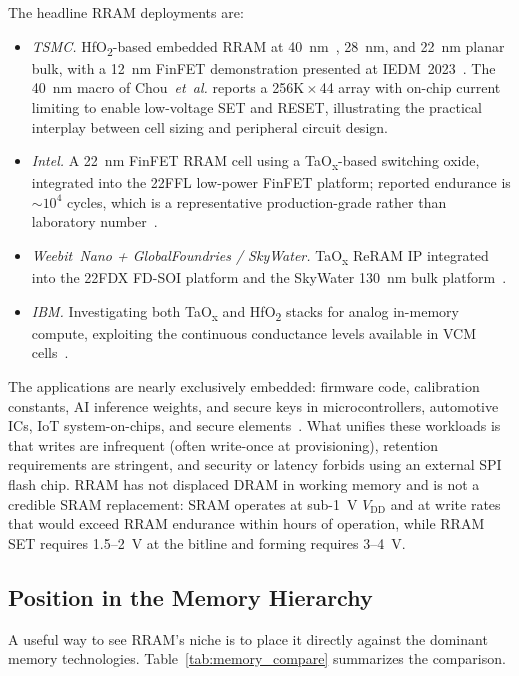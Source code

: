 \documentclass[lettersize,journal]{IEEEtran}
\begin{document}
The headline RRAM deployments are:
\begin{itemize}
\item \textit{TSMC.} HfO\textsubscript{2}-based embedded RRAM at 40~nm~\cite{ref_chou2018}, 28~nm, and 22~nm planar bulk, with a 12~nm FinFET demonstration presented at IEDM~2023~\cite{ref_hellenbrand2024}. The 40~nm macro of Chou~\textit{et~al.} reports a 256K\,$\times$\,44 array with on-chip current limiting to enable low-voltage SET and RESET, illustrating the practical interplay between cell sizing and peripheral circuit design.
\item \textit{Intel.} A 22~nm FinFET RRAM cell using a TaO\textsubscript{x}-based switching oxide, integrated into the 22FFL low-power FinFET platform; reported endurance is ${\sim}10^4$ cycles, which is a representative production-grade rather than laboratory number~\cite{ref_golonzka2019}.
\item \textit{Weebit~Nano + GlobalFoundries / SkyWater.} TaO\textsubscript{x} ReRAM IP integrated into the 22FDX FD-SOI platform and the SkyWater 130~nm bulk platform~\cite{ref_hellenbrand2024}.
\item \textit{IBM.} Investigating both TaO\textsubscript{x} and HfO\textsubscript{2} stacks for analog in-memory compute, exploiting the continuous conductance levels available in VCM cells~\cite{ref_hellenbrand2024,ref_ielmini_wong2018}.
\end{itemize}

The applications are nearly exclusively embedded: firmware code, calibration constants, AI inference weights, and secure keys in microcontrollers, automotive ICs, IoT system-on-chips, and secure elements~\cite{ref_hellenbrand2024}. What unifies these workloads is that writes are infrequent (often write-once at provisioning), retention requirements are stringent, and security or latency forbids using an external SPI flash chip. RRAM has not displaced DRAM in working memory and is not a credible SRAM replacement: SRAM operates at sub-1~V $V_\mathrm{DD}$ and at write rates that would exceed RRAM endurance within hours of operation, while RRAM SET requires 1.5--2~V at the bitline and forming requires 3--4~V.

\subsection{Position in the Memory Hierarchy}
A useful way to see RRAM's niche is to place it directly against the dominant memory technologies. Table~\ref{tab:memory_compare} summarizes the comparison.
\end{document}
